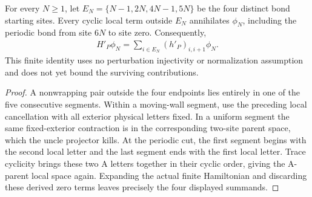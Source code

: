 \begin{lemma}
    \label{lem:uncle_trial_four_bond_localization}
    \leanok
    For every $N\ge1$, let
    $E_N=\{N-1,2N,4N-1,5N\}$ be the four distinct bond starting sites.
    Every cyclic local term outside $E_N$ annihilates $\phi_N$, including
    the periodic bond from site $6N$ to site zero. Consequently,
    \begin{align}
        H'_P\phi_N=\sum_{i\in E_N}(h'_P)_{i,i+1}\phi_N.
    \end{align}
    This finite identity uses no perturbation injectivity or normalization
    assumption and does not yet bound the surviving contributions.
\end{lemma}
\begin{proof}\leanok
    A nonwrapping pair outside the four endpoints lies entirely in one of
    the five consecutive segments. Within a moving-wall segment, use the
    preceding local cancellation with all exterior physical letters fixed.
    In a uniform segment the same fixed-exterior contraction is in the
    corresponding two-site parent space, which the uncle projector kills.
    At the periodic cut, the first segment begins with the second local
    letter and the last segment ends with the first local letter. Trace
    cyclicity brings these two A letters together in their cyclic order,
    giving the A-parent local space again. Expanding the actual finite
    Hamiltonian and discarding these derived zero terms leaves precisely
    the four displayed summands.
\end{proof}


